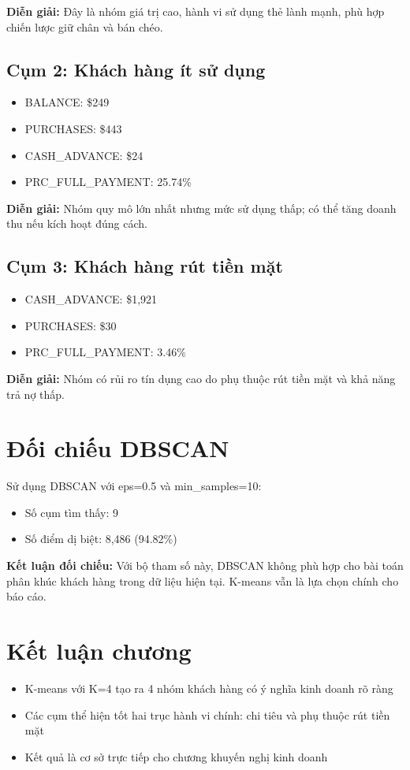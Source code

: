 \textbf{Diễn giải:} Đây là nhóm giá trị cao, hành vi sử dụng thẻ lành mạnh, phù hợp chiến lược giữ chân và bán chéo.

\subsection{Cụm 2: Khách hàng ít sử dụng}

\begin{itemize}
    \item BALANCE: \$249
    \item PURCHASES: \$443
    \item CASH\_ADVANCE: \$24
    \item PRC\_FULL\_PAYMENT: 25.74\%
\end{itemize}

\textbf{Diễn giải:} Nhóm quy mô lớn nhất nhưng mức sử dụng thấp; có thể tăng doanh thu nếu kích hoạt đúng cách.

\subsection{Cụm 3: Khách hàng rút tiền mặt}

\begin{itemize}
    \item CASH\_ADVANCE: \$1,921
    \item PURCHASES: \$30
    \item PRC\_FULL\_PAYMENT: 3.46\%
\end{itemize}

\textbf{Diễn giải:} Nhóm có rủi ro tín dụng cao do phụ thuộc rút tiền mặt và khả năng trả nợ thấp.

\section{Đối chiếu DBSCAN}

Sử dụng DBSCAN với eps=0.5 và min\_samples=10:
\begin{itemize}
    \item Số cụm tìm thấy: 9
    \item Số điểm dị biệt: 8,486 (94.82\%)
\end{itemize}

\textbf{Kết luận đối chiếu:} Với bộ tham số này, DBSCAN không phù hợp cho bài toán phân khúc khách hàng trong dữ liệu hiện tại. K-means vẫn là lựa chọn chính cho báo cáo.

\section{Kết luận chương}

\begin{itemize}
    \item K-means với K=4 tạo ra 4 nhóm khách hàng có ý nghĩa kinh doanh rõ ràng
    \item Các cụm thể hiện tốt hai trục hành vi chính: chi tiêu và phụ thuộc rút tiền mặt
    \item Kết quả là cơ sở trực tiếp cho chương khuyến nghị kinh doanh
\end{itemize}
